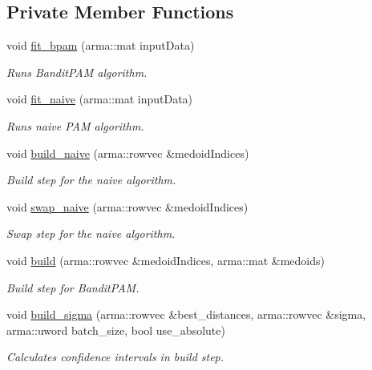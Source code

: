 \subsection*{Private Member Functions}
\begin{DoxyCompactItemize}
\item 
void \hyperlink{classKMedoids_afb08301b64e5be0b9f274a14908c7869}{fit\+\_\+bpam} (arma\+::mat input\+Data)
\begin{DoxyCompactList}\small\item\em Runs Bandit\+P\+AM algorithm. \end{DoxyCompactList}\item 
void \hyperlink{classKMedoids_a79fbb790f9f31bcaf1daa05e5eb5daa8}{fit\+\_\+naive} (arma\+::mat input\+Data)
\begin{DoxyCompactList}\small\item\em Runs naive P\+AM algorithm. \end{DoxyCompactList}\item 
void \hyperlink{classKMedoids_ae5ad25637d225be8c31bc3c934a8ec26}{build\+\_\+naive} (arma\+::rowvec \&medoid\+Indices)
\begin{DoxyCompactList}\small\item\em Build step for the naive algorithm. \end{DoxyCompactList}\item 
void \hyperlink{classKMedoids_ab856c5e9919b8eb63e4d36253abcd272}{swap\+\_\+naive} (arma\+::rowvec \&medoid\+Indices)
\begin{DoxyCompactList}\small\item\em Swap step for the naive algorithm. \end{DoxyCompactList}\item 
void \hyperlink{classKMedoids_af63f9e9a234315783a9f77dfa8a0cbc6}{build} (arma\+::rowvec \&medoid\+Indices, arma\+::mat \&medoids)
\begin{DoxyCompactList}\small\item\em Build step for Bandit\+P\+AM. \end{DoxyCompactList}\item 
void \hyperlink{classKMedoids_aa655c4a1d55d8d49be343f3d6d62a0c2}{build\+\_\+sigma} (arma\+::rowvec \&best\+\_\+distances, arma\+::rowvec \&sigma, arma\+::uword batch\+\_\+size, bool use\+\_\+absolute)
\begin{DoxyCompactList}\small\item\em Calculates confidence intervals in build step. \end{DoxyCompactList}\item 

\end{DoxyCompactItemize}
